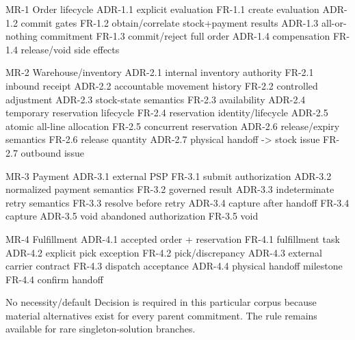 \documentclass[
  10pt,
]{article}
\newenvironment{Shaded}{}{}
\newcommand{\NormalTok}[1]{#1}
\begin{document}
\begin{Shaded}
\begin{Highlighting}[]
\NormalTok{MR{-}1 Order lifecycle}
\NormalTok{  ADR{-}1.1 explicit evaluation}
\NormalTok{    FR{-}1.1 create evaluation}
\NormalTok{  ADR{-}1.2 commit gates}
\NormalTok{    FR{-}1.2 obtain/correlate stock+payment results}
\NormalTok{  ADR{-}1.3 all{-}or{-}nothing commitment}
\NormalTok{    FR{-}1.3 commit/reject full order}
\NormalTok{  ADR{-}1.4 compensation}
\NormalTok{    FR{-}1.4 release/void side effects}

\NormalTok{MR{-}2 Warehouse/inventory}
\NormalTok{  ADR{-}2.1 internal inventory authority}
\NormalTok{    FR{-}2.1 inbound receipt}
\NormalTok{  ADR{-}2.2 accountable movement history}
\NormalTok{    FR{-}2.2 controlled adjustment}
\NormalTok{  ADR{-}2.3 stock{-}state semantics}
\NormalTok{    FR{-}2.3 availability}
\NormalTok{  ADR{-}2.4 temporary reservation lifecycle}
\NormalTok{    FR{-}2.4 reservation identity/lifecycle}
\NormalTok{  ADR{-}2.5 atomic all{-}line allocation}
\NormalTok{    FR{-}2.5 concurrent reservation}
\NormalTok{  ADR{-}2.6 release/expiry semantics}
\NormalTok{    FR{-}2.6 release quantity}
\NormalTok{  ADR{-}2.7 physical handoff {-}\textgreater{} stock issue}
\NormalTok{    FR{-}2.7 outbound issue}

\NormalTok{MR{-}3 Payment}
\NormalTok{  ADR{-}3.1 external PSP}
\NormalTok{    FR{-}3.1 submit authorization}
\NormalTok{  ADR{-}3.2 normalized payment semantics}
\NormalTok{    FR{-}3.2 governed result}
\NormalTok{  ADR{-}3.3 indeterminate retry semantics}
\NormalTok{    FR{-}3.3 resolve before retry}
\NormalTok{  ADR{-}3.4 capture after handoff}
\NormalTok{    FR{-}3.4 capture}
\NormalTok{  ADR{-}3.5 void abandoned authorization}
\NormalTok{    FR{-}3.5 void}

\NormalTok{MR{-}4 Fulfillment}
\NormalTok{  ADR{-}4.1 accepted order + reservation}
\NormalTok{    FR{-}4.1 fulfillment task}
\NormalTok{  ADR{-}4.2 explicit pick exception}
\NormalTok{    FR{-}4.2 pick/discrepancy}
\NormalTok{  ADR{-}4.3 external carrier contract}
\NormalTok{    FR{-}4.3 dispatch acceptance}
\NormalTok{  ADR{-}4.4 physical handoff milestone}
\NormalTok{    FR{-}4.4 confirm handoff}
\end{Highlighting}
\end{Shaded}

No necessity/default Decision is required in this particular corpus
because material alternatives exist for every parent commitment. The
rule remains available for rare singleton-solution branches.
\end{document}
